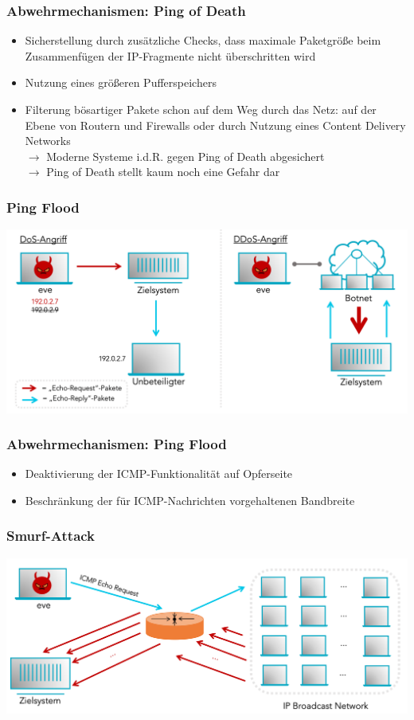 \documentclass{beamer}
\begin{document}
\begin{frame}
	\frametitle{Abwehrmechanismen: Ping of Death}
	\begin{itemize}
		\item Sicherstellung durch zusätzliche Checks, dass maximale Paketgröße beim Zusammenfügen der IP-Fragmente nicht überschritten wird
		\item Nutzung eines größeren Pufferspeichers
		\item Filterung bösartiger Pakete schon auf dem Weg durch das Netz: auf der Ebene von Routern und Firewalls oder durch Nutzung eines Content Delivery Networks \\ $\rightarrow$ Moderne Systeme i.d.R. gegen Ping of Death abgesichert \\ $\rightarrow$ Ping of Death stellt kaum noch eine Gefahr dar
	\end{itemize}
\end{frame}

\begin{frame}
	\frametitle{Ping Flood}
	\begin{center}
		\includegraphics[width=0.9\linewidth]{img/6}
	\end{center}
\end{frame}

\begin{frame}
	\frametitle{Abwehrmechanismen: Ping Flood}
	\begin{itemize}
		\item Deaktivierung der ICMP-Funktionalität auf Opferseite
		\item Beschränkung der für ICMP-Nachrichten vorgehaltenen Bandbreite
	\end{itemize}
\end{frame}

\begin{frame}
	\frametitle{Smurf-Attack}
	\begin{center}
		\includegraphics[width=0.9\linewidth]{img/smurf}
	\end{center}
\end{frame}
\end{document}
